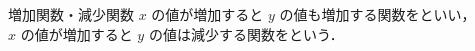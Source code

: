 \documentclass[14pt]{jsarticle}
\begin{document}


\vfill
\nextpage

\begin{definitionbox}{増加関数・減少関数}
  $x$ の値が増加すると $y$ の値も増加する関数をといい，\\
  $x$ の値が増加すると $y$ の値は減少する関数をという．
\end{definitionbox}
\end{document}

